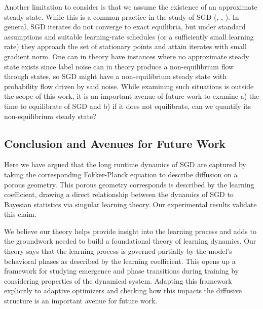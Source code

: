 \documentclass{article} %
\theoremstyle{definition}
\begin{document}
Another limitation to consider is that we assume the existence of an approximate steady state. While this is a common practice in the study of SGD (\citep{pesme2020convergencediagnosticbasedstepsizes}, \citep{pmlr-v48-mandt16}, \citep{mandt2018stochasticgradientdescentapproximate}). In general, SGD iterates do not converge to exact equilibria, but under standard assumptions and suitable learning-rate schedules (or a sufficiently small learning rate) they approach the set of stationary points and attain iterates with small gradient norm. One can in theory have instances where no approximate steady state exists since label noise can in theory produce a non-equilibrium flow through states, so SGD might have a non-equilibrium steady state with probability flow driven by said noise. While examining such situations is outside the scope of this work, it is an important avenue of future work to examine a) the time to equilibrate of SGD and b) if it does not equilibrate, can we quantify its non-equilibrium steady state?



\subsection{Conclusion and Avenues for Future Work}
Here we have argued that the long runtime dynamics of SGD are captured by taking the corresponding Fokker-Planck equation to describe diffusion on a porous geometry. This porous geometry corresponds is described by the learning coefficient, drawing a direct relationship between the dynamics of SGD to Bayesian statistics via singular learning theory. Our experimental results validate this claim.

We believe our theory helps provide insight into the learning process and adds to the groundwork needed to build a foundational theory of learning dynamics. Our theory says that the learning process is governed partially by the model's behavioral phases as described by the learning coefficient. This opens up a framework for studying emergence and phase transitions during training by considering properties of the dynamical system. Adapting this framework explicitly to adaptive optimizers and checking how this impacts the diffusive structure is an important avenue for future work. %
\end{document}
